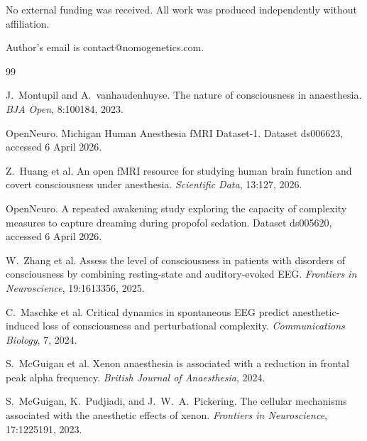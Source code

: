 \documentclass[11pt,a4paper]{article}
\numberwithin{equation}{section}
\theoremstyle{thmcompact}
\theoremstyle{remark}
\begin{document}
No external funding was received. All work was produced independently without affiliation.

Author's email is contact@nomogenetics.com.

\begin{thebibliography}{99}

J.~Montupil and A.~vanhaudenhuyse.
\newblock The nature of consciousness in anaesthesia.
\newblock \emph{BJA Open}, 8:100184, 2023.

OpenNeuro.
\newblock Michigan Human Anesthesia fMRI Dataset-1.
\newblock Dataset ds006623, accessed 6 April 2026.

Z.~Huang et al.
\newblock An open fMRI resource for studying human brain function and covert consciousness under anesthesia.
\newblock \emph{Scientific Data}, 13:127, 2026.

OpenNeuro.
\newblock A repeated awakening study exploring the capacity of complexity measures to capture dreaming during propofol sedation.
\newblock Dataset ds005620, accessed 6 April 2026.

W.~Zhang et al.
\newblock Assess the level of consciousness in patients with disorders of consciousness by combining resting-state and auditory-evoked EEG.
\newblock \emph{Frontiers in Neuroscience}, 19:1613356, 2025.

C.~Maschke et al.
\newblock Critical dynamics in spontaneous EEG predict anesthetic-induced loss of consciousness and perturbational complexity.
\newblock \emph{Communications Biology}, 7, 2024.

S.~McGuigan et al.
\newblock Xenon anaesthesia is associated with a reduction in frontal peak alpha frequency.
\newblock \emph{British Journal of Anaesthesia}, 2024.

S.~McGuigan, K.~Pudjiadi, and J.~W.~A.~Pickering.
\newblock The cellular mechanisms associated with the anesthetic effects of xenon.
\newblock \emph{Frontiers in Neuroscience}, 17:1225191, 2023.

\end{thebibliography}
\end{document}

